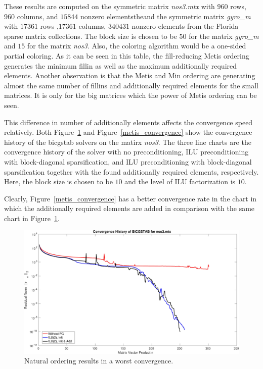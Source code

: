 \documentclass[12pt, oneside]{book}
\begin{document}
These results are computed on the symmetric matrix \textit{nos3.mtx} with $960$ rows, $960$ columns, and $15844$ nonzero elementstheand the symmetric matrix \textit{gyro\_m} with
$17361$ rows ,$17361$ columns, $340431$ nonzero elements from 
the Florida sparse matrix collections. The block size is
chosen to be $50$ for the matrix \textit{gyro\_m} and $15$ for 
the matrix \textit{nos3}. Also, the coloring algorithm would be a one-sided
partial coloring. As it can be seen in this table, the fill-reducing Metis ordering 
generates the minimum fillin as well as the maximum additionally required elements.
Another observation is that the Metis and Min ordering are generating almost the same
number of fillins and additionally required elements for the small matrices. 
It is only for the big matrices which the power of Metis ordering can be seen.

This difference in number of additionally elements affects the convergence speed
relatively. Both Figure~\ref{nat_convergence} and Figure~\ref{metis_convergence} show
the convergence history of the bicgstab solvers on the matirx \textit{nos3}.
The three line charts are the convergence history of the solver with
no preconditioning, ILU preconditioning with block-diagonal sparsification,
and ILU preconditioning with block-diagonal sparsification together with the found
additionally required elements, respectively.
Here, the block size is chosen to be $10$ and the level of ILU factorization
is $10$.

Clearly, Figure~\ref{metis_convergence} has a better convergence rate in the chart
in which the additionally required elements are added in comparison with the same 
chart in Figure~\ref{nat_convergence}.

\begin{figure}
\includegraphics[width=\linewidth]{nos3_mtx_convergence_nat}
\caption{Natural ordering results in a worst convergence.}
\label{nat_convergence}
\end{figure}
\end{document}
